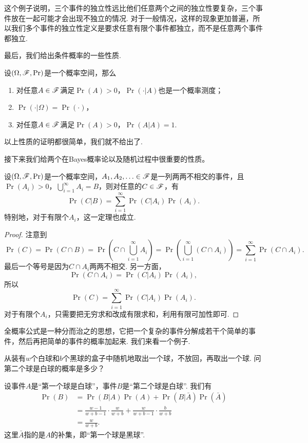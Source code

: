 这个例子说明，三个事件的独立性远比他们任意两个之间的独立性要复杂，三个事件放在一起可能才会出现不独立的情况. 对于一般情况，这样的现象更加普遍，所以我们多个事件的独立性定义是要求任意有限个事件都独立，而不是任意两个事件都独立. 

最后，我们给出条件概率的一些性质. 

\begin{proposition}\label{prop:conditional-probability}
设$(\Omega,\mathscr{F},\Pr)$是一个概率空间，那么
\begin{enumerate}
    \item 对任意$A\in\mathscr{F}$满足$\Pr(A)>0$，$\Pr(\cdot|A)$也是一个概率测度；
    \item $\Pr(\cdot|\Omega)=\Pr(\cdot)$，
    \item 对任意$A\in\mathscr{F}$满足$\Pr(A)>0$，$\Pr(A|A)=1$.
\end{enumerate}
\end{proposition}
以上性质的证明都很简单，我们就不给出了. 

接下来我们给两个在Bayes概率论以及随机过程中很重要的性质。

\begin{theorem}[全概率公式]\label{thm:total-probability}
设$(\Omega,\mathscr{F},\Pr)$是一个概率空间，$A_1,A_2,\ldots\in\mathscr{F}$是一列两两不相交的事件，且$\Pr(A_i)>0$，$\bigcup_{i=1}^\infty A_i=B$，则对任意的$C\in\mathscr{F}$，有
\[
    \Pr(C|B) = \sum_{i=1}^\infty \Pr(C|A_i)\Pr(A_i).
\]
特别地，对于有限个$A_i$，这一定理也成立. 
\end{theorem}
\begin{proof}
注意到
\[
    \Pr(C) = \Pr(C\cap B) = \Pr\left(C\cap\bigcup_{i=1}^\infty A_i\right) = \Pr\left(\bigcup_{i=1}^\infty (C\cap A_i)\right) = \sum_{i=1}^\infty \Pr(C\cap A_i).
\]
最后一个等号是因为$C\cap A_i$两两不相交. 另一方面，
\[
    \Pr(C\cap A_i) = \Pr(C|A_i)\Pr(A_i),
\]
所以
\[
    \Pr(C) = \sum_{i=1}^\infty \Pr(C|A_i)\Pr(A_i).
\]
对于有限个$A_i$，只需要把无穷求和改成有限求和，利用有限可加性即可. 
\end{proof}

全概率公式是一种分而治之的思想，它把一个复杂的事件分解成若干个简单的事件，然后再把简单的事件的概率加起来. 我们来看一个例子. 

\begin{example}
    从装有$w$个白球和$b$个黑球的盒子中随机地取出一个球，不放回，再取出一个球. 问第二个球是白球的概率是多少？

    设事件$A$是“第一个球是白球”，事件$B$是“第二个球是白球”. 我们有
\begin{align*}
    \Pr(B) &= \Pr(B|A)\Pr(A) + \Pr(B|\bar{A})\Pr(\bar{A}) \\
    &=\frac{w-1}{w+b-1}\cdot\frac{w}{w+b} + \frac{w}{w+b-1}\cdot\frac{b}{w+b}\\
    &=\frac{w}{w+b}.
\end{align*}
    这里$\bar A$指的是$A$的补集，即“第一个球是黑球”. 
\end{example}

